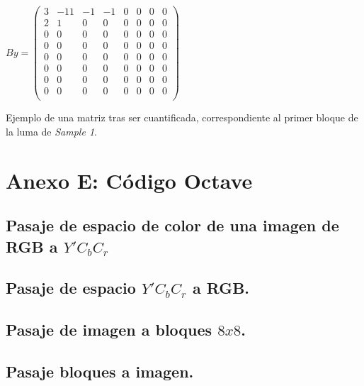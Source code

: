 \documentclass[%
final,
%
reprint,
%
notitlepage,
narroweqnarray,
inline,
twoside,
invited
]{ieee}
\begin{document}
\begin{center}
\( By = 
\begin{pmatrix}
3 & -11 & -1 & -1 & 0 & 0 & 0 & 0 \\
2 & 1 & 0 & 0 & 0 & 0 & 0 & 0 \\
0 & 0 & 0 & 0 & 0 & 0 & 0 & 0 \\ 
0 & 0 & 0 & 0 & 0 & 0 & 0 & 0 \\ 
0 & 0 & 0 & 0 & 0 & 0 & 0 & 0 \\
0 & 0 & 0 & 0 & 0 & 0 & 0 & 0  \\ 
0 & 0 & 0 & 0 & 0 & 0 & 0 & 0 \\
0 & 0 & 0 & 0 & 0 & 0 & 0 & 0 \\ 
\end{pmatrix}\)
\end{center}
\begin{center} Ejemplo de una matriz tras ser cuantificada, correspondiente al primer bloque de la luma de \textit{Sample 1}.
\end{center}

\section*{Anexo E: Código Octave}

\subsection{Pasaje de espacio de color de una imagen de RGB a $Y'C_bC_r$}


\subsection{Pasaje de espacio $Y'C_bC_r$ a RGB. }


\subsection{Pasaje de imagen a bloques $8x8$. }


\subsection{Pasaje bloques a imagen. }

\end{document}
